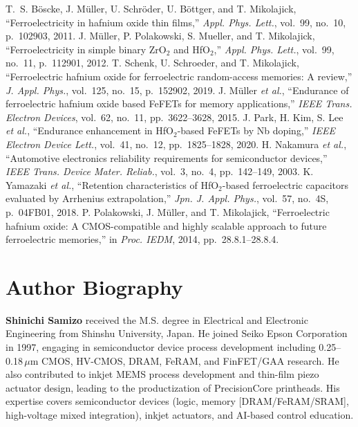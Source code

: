 \documentclass[journal]{IEEEtran}
\begin{document}
\begin{thebibliography}{00}
 T.~S. B\"oscke, J. M\"uller, U. Schr\"oder, U. B\"ottger, and T. Mikolajick, ``Ferroelectricity in hafnium oxide thin films,'' \textit{Appl. Phys. Lett.}, vol.~99, no.~10, p.~102903, 2011.
 J. M\"uller, P. Polakowski, S. Mueller, and T. Mikolajick, ``Ferroelectricity in simple binary ZrO$_2$ and HfO$_2$,'' \textit{Appl. Phys. Lett.}, vol.~99, no.~11, p.~112901, 2012.
 T. Schenk, U. Schroeder, and T. Mikolajick, ``Ferroelectric hafnium oxide for ferroelectric random-access memories: A review,'' \textit{J. Appl. Phys.}, vol.~125, no.~15, p.~152902, 2019.
 J. M\"uller \textit{et al.}, ``Endurance of ferroelectric hafnium oxide based FeFETs for memory applications,'' \textit{IEEE Trans. Electron Devices}, vol.~62, no.~11, pp.~3622--3628, 2015.
 J. Park, H. Kim, S. Lee \textit{et al.}, ``Endurance enhancement in HfO$_2$-based FeFETs by Nb doping,'' \textit{IEEE Electron Device Lett.}, vol.~41, no.~12, pp.~1825--1828, 2020.
 H. Nakamura \textit{et al.}, ``Automotive electronics reliability requirements for semiconductor devices,'' \textit{IEEE Trans. Device Mater. Reliab.}, vol.~3, no.~4, pp.~142--149, 2003.
 K. Yamazaki \textit{et al.}, ``Retention characteristics of HfO$_2$-based ferroelectric capacitors evaluated by Arrhenius extrapolation,'' \textit{Jpn. J. Appl. Phys.}, vol.~57, no.~4S, p.~04FB01, 2018.
 P. Polakowski, J. M\"uller, and T. Mikolajick, ``Ferroelectric hafnium oxide: A CMOS-compatible and highly scalable approach to future ferroelectric memories,'' in \textit{Proc. IEDM}, 2014, pp.~28.8.1--28.8.4.
\end{thebibliography}

\section*{Author Biography}
\textbf{Shinichi Samizo} received the M.S. degree in Electrical and Electronic Engineering from Shinshu University, Japan. He joined Seiko Epson Corporation in 1997, engaging in semiconductor device process development including 0.25–0.18\,$\mu$m CMOS, HV-CMOS, DRAM, FeRAM, and FinFET/GAA research. He also contributed to inkjet MEMS process development and thin-film piezo actuator design, leading to the productization of PrecisionCore printheads. His expertise covers semiconductor devices (logic, memory [DRAM/FeRAM/SRAM], high-voltage mixed integration), inkjet actuators, and AI-based control education.
\end{document}
